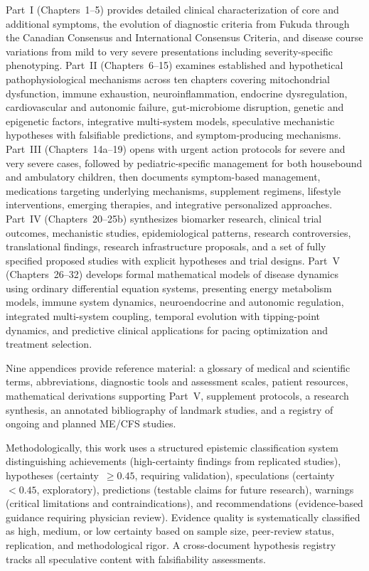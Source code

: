 Part~I (Chapters~1--5) provides detailed clinical characterization of core and additional symptoms, the evolution of diagnostic criteria from Fukuda through the Canadian Consensus and International Consensus Criteria, and disease course variations from mild to very severe presentations including severity-specific phenotyping. Part~II (Chapters~6--15) examines established and hypothetical pathophysiological mechanisms across ten chapters covering mitochondrial dysfunction, immune exhaustion, neuroinflammation, endocrine dysregulation, cardiovascular and autonomic failure, gut-microbiome disruption, genetic and epigenetic factors, integrative multi-system models, speculative mechanistic hypotheses with falsifiable predictions, and symptom-producing mechanisms. Part~III (Chapters~14a--19) opens with urgent action protocols for severe and very severe cases, followed by pediatric-specific management for both housebound and ambulatory children, then documents symptom-based management, medications targeting underlying mechanisms, supplement regimens, lifestyle interventions, emerging therapies, and integrative personalized approaches. Part~IV (Chapters~20--25b) synthesizes biomarker research, clinical trial outcomes, mechanistic studies, epidemiological patterns, research controversies, translational findings, research infrastructure proposals, and a set of fully specified proposed studies with explicit hypotheses and trial designs. Part~V (Chapters~26--32) develops formal mathematical models of disease dynamics using ordinary differential equation systems, presenting energy metabolism models, immune system dynamics, neuroendocrine and autonomic regulation, integrated multi-system coupling, temporal evolution with tipping-point dynamics, and predictive clinical applications for pacing optimization and treatment selection.

Nine appendices provide reference material: a glossary of medical and scientific terms, abbreviations, diagnostic tools and assessment scales, patient resources, mathematical derivations supporting Part~V, supplement protocols, a research synthesis, an annotated bibliography of landmark studies, and a registry of ongoing and planned ME/CFS studies.

Methodologically, this work uses a structured epistemic classification system distinguishing achievements (high-certainty findings from replicated studies), hypotheses (certainty~$\geq 0.45$, requiring validation), speculations (certainty~$< 0.45$, exploratory), predictions (testable claims for future research), warnings (critical limitations and contraindications), and recommendations (evidence-based guidance requiring physician review). Evidence quality is systematically classified as high, medium, or low certainty based on sample size, peer-review status, replication, and methodological rigor. A cross-document hypothesis registry tracks all speculative content with falsifiability assessments.

